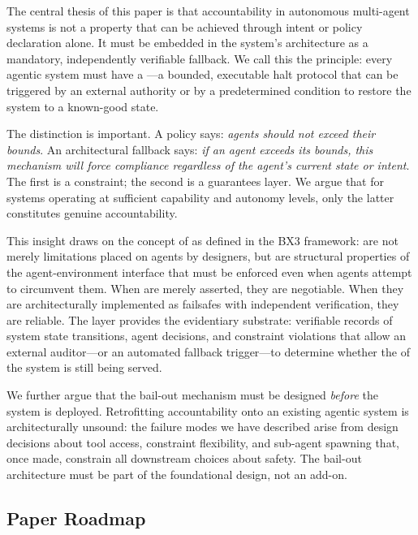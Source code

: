 The central thesis of this paper is that accountability in autonomous multi-agent systems is not a property that can be achieved through intent or policy declaration alone. It must be embedded in the system's architecture as a mandatory, independently verifiable fallback. We call this the \bxthree principle: every agentic system must have a \bxthree—a bounded, executable halt protocol that can be triggered by an external authority or by a predetermined condition to restore the system to a known-good state.

The distinction is important. A policy says: \textit{agents should not exceed their bounds}. An architectural fallback says: \textit{if an agent exceeds its bounds, this mechanism will force compliance regardless of the agent's current state or intent}. The first is a constraint; the second is a guarantees layer. We argue that for systems operating at sufficient capability and autonomy levels, only the latter constitutes genuine accountability.

This insight draws on the concept of \bounds as defined in the BX3 framework: \bounds are not merely limitations placed on agents by designers, but are structural properties of the agent-environment interface that must be enforced even when agents attempt to circumvent them. When \bounds are merely asserted, they are negotiable. When they are architecturally implemented as failsafes with independent verification, they are reliable. The \fact layer provides the evidentiary substrate: verifiable records of system state transitions, agent decisions, and constraint violations that allow an external auditor—or an automated fallback trigger—to determine whether the \purpose of the system is still being served.

We further argue that the bail-out mechanism must be designed \textit{before} the system is deployed. Retrofitting accountability onto an existing agentic system is architecturally unsound: the failure modes we have described arise from design decisions about tool access, constraint flexibility, and sub-agent spawning that, once made, constrain all downstream choices about safety. The bail-out architecture must be part of the foundational design, not an add-on.

\subsection{Paper Roadmap}

